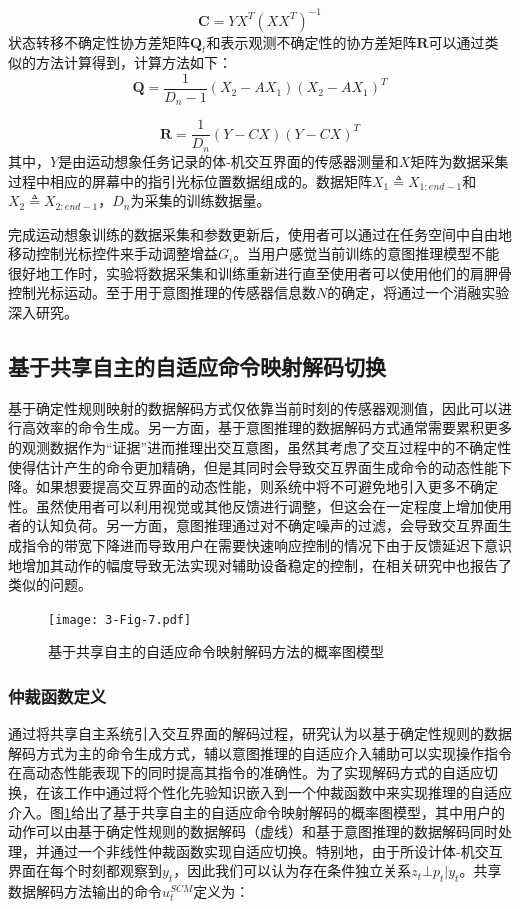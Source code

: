 \begin{equation}
\boldsymbol{C} = YX^T(XX^T)^{-1}
\end{equation}
状态转移不确定性协方差矩阵${{\boldsymbol{Q}}_t}$和表示观测不确定性的协方差矩阵${{\boldsymbol{R}}}$可以通过类似的方法计算得到，计算方法如下：
\begin{equation}
{\boldsymbol{Q}} = \frac{1}{D_n-1}(X_2 - AX_1)(X_2 - AX_1)^T
\end{equation}

\begin{equation}
{\boldsymbol{R}} = \frac{1}{D_n}(Y - CX)(Y - CX)^T
\end{equation}
其中，$Y$是由运动想象任务记录的体-机交互界面的传感器测量和$X$矩阵为数据采集过程中相应的屏幕中的指引光标位置数据组成的。数据矩阵$X_1\triangleq X_{1:end-1}$和$X_2\triangleq X_{2:end-1}$，$D_n$为采集的训练数据量。

完成运动想象训练的数据采集和参数更新后，使用者可以通过在任务空间中自由地移动控制光标控件来手动调整增益${G_i}$。当用户感觉当前训练的意图推理模型不能很好地工作时，实验将数据采集和训练重新进行直至使用者可以使用他们的肩胛骨控制光标运动。至于用于意图推理的传感器信息数$N$的确定，将通过一个消融实验深入研究。  

\subsection{基于共享自主的自适应命令映射解码切换}  基于确定性规则映射的数据解码方式仅依靠当前时刻的传感器观测值，因此可以进行高效率的命令生成。另一方面，基于意图推理的数据解码方式通常需要累积更多的观测数据作为``证据''进而推理出交互意图，虽然其考虑了交互过程中的不确定性使得估计产生的命令更加精确，但是其同时会导致交互界面生成命令的动态性能下降。如果想要提高交互界面的动态性能，则系统中将不可避免地引入更多不确定性。虽然使用者可以利用视觉或其他反馈进行调整，但这会在一定程度上增加使用者的认知负荷。另一方面，意图推理通过对不确定噪声的过滤，会导致交互界面生成指令的带宽下降进而导致用户在需要快速响应控制的情况下由于反馈延迟下意识地增加其动作的幅度导致无法实现对辅助设备稳定的控制，在相关研究\cite{seanez-gonzalezStaticDynamicDecoding2017}中也报告了类似的问题。

\begin{figure}[htb]
    \centering
    \texttt{[image: 3-Fig-7.pdf]}
    \caption{基于共享自主的自适应命令映射解码方法的概率图模型}
    \label{fig:3-7}
\end{figure} 

\subsubsection{仲裁函数定义} 
通过将共享自主系统引入交互界面的解码过程，研究认为以基于确定性规则的数据解码方式为主的命令生成方式，辅以意图推理的自适应介入辅助可以实现操作指令在高动态性能表现下的同时提高其指令的准确性。为了实现解码方式的自适应切换，在该工作中通过将个性化先验知识嵌入到一个仲裁函数中来实现推理的自适应介入。图\ref{fig:3-7}给出了基于共享自主的自适应命令映射解码的概率图模型，其中用户的动作可以由基于确定性规则的数据解码（虚线）和基于意图推理的数据解码同时处理，并通过一个非线性仲裁函数实现自适应切换。特别地，由于所设计体-机交互界面在每个时刻都观察到${y_t}$，因此我们可以认为存在条件独立关系${z_t} \bot {p_t}|{y_t}$。共享数据解码方法输出的命令$u_t^{SCM}$定义为：


